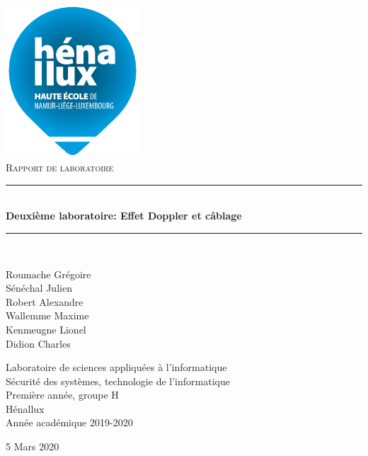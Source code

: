 \documentclass[a4paper]{article}
\newcommand{\HRule}{\rule{\linewidth}{0.5mm}}
\newcommand{\bgimg}[1]{
\AddToShipoutPicture
   {
      \put(\LenToUnit{0 cm},\LenToUnit{0 cm})
      {
            \texttt{[image: \#1]} 
      }
   }
}
\begin{document}

















\begin{titlepage}
  \begin{sffamily}
  \begin{center}
    \includegraphics[width=5cm]{LogoHenallux.PNG}~\\[1.5cm]
    \textsc{\Large Rapport de laboratoire}\\[1.5cm]
    \HRule \\[0.4cm]
    { \huge \bfseries Deuxième laboratoire: Effet Doppler et câblage\\[0.4cm] }
    \HRule \\[2cm]
    \begin{minipage}{0.4\textwidth}
      \begin{flushleft} \large
        Roumache Grégoire\\
        Sénéchal Julien\\
        Robert Alexandre\\
        Wallemme Maxime\\
        Kenmeugne Lionel\\
        Didion Charles
      \end{flushleft}
    \end{minipage}
    \begin{minipage}{0.55\textwidth}
      \begin{flushright} \large
    	Laboratoire de sciences appliquées à l'informatique\\
		Sécurité des systèmes, technologie de l'informatique\\
		Première année, groupe H \\
		Hénallux\\
		Année académique 2019-2020\\
      \end{flushright}
    \end{minipage}
    \vfill
    {\large 5 Mars 2020}
  \end{center}
  \end{sffamily}
\end{titlepage}
\end{document}
